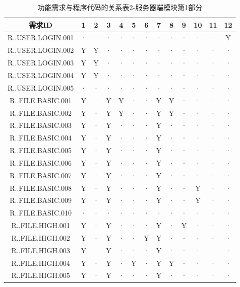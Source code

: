 \begin{table}[!ht]
\centering
\caption{功能需求与程序代码的关系表2-服务器端模块第1部分} \label{tab:requirement-module}
\begin{tabular}{|c|c|c|c|c|c|c|c|c|c|c|c|c|}
    \hline 
    需求ID & 1 & 2 & 3 & 4 & 5 & 6 & 7 & 8 & 9 & 10 & 11 & 12 \\    
    \hline 
    R..USER.LOGIN.001 &· &· &· &· &· &· &· &· &· &· &· &Y \\
    \hline
    R..USER.LOGIN.002 &Y&Y&· &· &· &· &· &· &· &· &· &  ·\\
    \hline 
    R..USER.LOGIN.003 &Y&Y&· &· &· &· &· &· &· &· &· &  ·\\
    \hline
    R..USER.LOGIN.004 &Y&Y&· &· &· &· &· &· &· &· &· &  ·\\
    \hline
    R..USER.LOGIN.005 &· &· &· &· &· &· &· &· &· &· &· &  ·\\
    \hline
    R..FILE.BASIC.001 &Y&· &Y&Y&· &· &Y&Y&· &· &· &  ·\\
    \hline
    R..FILE.BASIC.002 &Y&· &Y&Y&· &· &Y&Y&· &· &· &  ·\\
    \hline 
    R..FILE.BASIC.003 &Y&· &Y&· &· &· &Y&· &· &· &· &  ·\\
    \hline
    R..FILE.BASIC.004 &Y&· &Y&· &· &· &Y&· &· &· &· &  ·\\
    \hline
    R..FILE.BASIC.005 &Y&· &Y&· &· &· &Y&· &· &· &· &  ·\\
    \hline
    R..FILE.BASIC.006 &Y&· &Y&· &· &· &Y&· &· &· &· &  ·\\ 
    \hline
    R..FILE.BASIC.007 &Y&· &Y&· &· &· &Y&· &· &· &· &  ·\\
    \hline
    R..FILE.BASIC.008 &Y&· &Y&· &· &· &Y&· &· &Y&· &  ·\\
    \hline
    R..FILE.BASIC.009 &Y&· &Y&· &· &· &Y&· &· &Y&· &  ·\\ 
    \hline
    R..FILE.BASIC.010 &· &· &· &· &· &· &· &· &· &· &· &  ·\\ 
    \hline
    R..FILE.HIGH.001 &Y&· &Y&· &· &· &Y&· &Y&· &· &  ·\\
    \hline
    R..FILE.HIGH.002 &Y&· &Y&· &· &Y&Y&· &· &· &· &  ·\\
    \hline
    R..FILE.HIGH.003 &Y&· &Y&· &· &· &Y&· &· &· &· &  ·\\
    \hline
    R..FILE.HIGH.004 &Y&· &Y&· &Y&· &Y&Y&· &· &· &  ·\\
    \hline
    R..FILE.HIGH.005 &Y&· &Y&· &· &· &Y&· &· &· &· &  ·\\
    \hline
\end{tabular}
\end{table}

